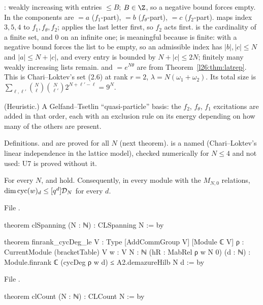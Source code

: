 \begin{dictionary}
:  weakly increasing with entries $\le B$; $B\in\Z$, so a negative bound forces  empty.
In  the components are $=a$ ($f_1$-part), $=b$ ($f_\theta$-part),
$=c$ ($f_2$-part).  maps index $3,5,4$ to $f_1,f_\theta,f_2$;  applies the last letter
first, so $f_2$ acts first.  is the cardinality of a finite set, and $0$ on an infinite one;  is meaningful
because  is finite:  with a negative bound forces the list to be empty, so an admissible index has
$|b|,|c|\le N$ and $|a|\le N+|c|$, and every entry is bounded by $N+|c|\le2N$; finitely many weakly increasing lists remain.
 and 
$=e^{N\theta}$ are from Theorem~\ref{l26:thm:latrep}. This is Chari--Loktev's set (2.6) at rank $r=2$,
$\lambda=N(\omega_1+\omega_2)$. Its total size is $\sum_{\ell,\ell'}\binom N\ell\binom N{\ell'}2^{N+\ell'-\ell}=9^N$.
\end{dictionary}

\begin{physics}
(Heuristic.) A Gelfand--Tsetlin ``quasi-particle'' basis: the $f_2$, $f_\theta$, $f_1$ excitations are added in that order, each with
an exclusion rule on its energy depending on how many of the others are present.
\end{physics}

\begin{status}
Definitions.  and  are proved for all $N$ (next theorem).  is a
named  (Chari--Loktev's linear independence in the lattice model), checked numerically for $N\le4$ and not used:
U7 is proved without it.
\end{status}

\begin{theorem}\label{l26:thm:cl}
For every $N$,  and  hold. Consequently, in every module with the $M_{N,0}$ relations,
$\dim\operatorname{cyc}(w)_d\le[q^d]\mathcal D_N$ for every $d$.
\end{theorem}
\noindent File .
\begin{leancode}
theorem clSpanning (N : ℕ) : CLSpanning N := by

theorem finrank_cycDeg_le {V : Type} [AddCommGroup V] [Module ℂ V] {ρ : CurrentModule (bracketTable) V}
    {w : V} {N : ℕ} (hR : MabRel ρ w N 0) (d : ℕ) :
    Module.finrank ℂ (cycDeg ρ w d) ≤ A2.demazureHilb N d := by
\end{leancode}
\noindent File .
\begin{leancode}
theorem clCount (N : ℕ) : CLCount N := by
\end{leancode}

